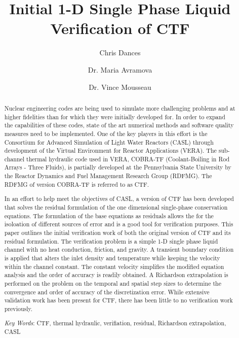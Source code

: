 \documentclass{mc2015}
\begin{document}
\title{Initial 1-D Single Phase Liquid Verification of CTF}

\author{Chris Dances}
\author{Dr. Maria Avramova}

\author{Dr. Vince Mousseau}

\maketitle

\begin{abstract}
Nuclear engineering codes are being used to simulate more challenging problems
and at higher fidelities than for which they were initially developed for. In
order to expand the capabilities of these codes, state of the art numerical methods and
software quality measures need to be implemented. One of the key players in this
effort is the Consortium for Advanced Simulation of Light Water Reactors (CASL) through
development of the Virtual Environment for Reactor Applications (VERA). The
sub-channel thermal hydraulic code used in VERA, COBRA-TF (Coolant-Boiling in
Rod Arrays - Three Fluids), is partially developed at the Pennsylvania State
University by the Reactor Dynamics and Fuel Management Research Group (RDFMG).
The RDFMG of version COBRA-TF is referred to as CTF.

In an effort to help meet the objectives of CASL, a version of CTF has been
developed that solves the residual formulation of the one dimensional 
single-phase conservation equations. The formulation of the base equations as
residuals allows the for the isoloation of different sources of error and is a
good tool for verification purposes. This paper outlines the initial
verification work of both the original version of CTF and its residual
formulation. The verification problem is a simple 1-D single phase liquid
channel with no heat conduction, friction, and gravity. A transient boundary
condition is applied that alters the inlet density and temperature while keeping
the velocity within the channel constant. The constant velocity simplifies the modified
equation analysis and the order of accuracy is readily obtained. A Richardson
extrapolation is performed on the problem on the temporal and spatial step sizes
to determine the convergence and order of accuracy of the discretization error.
While extensive validation work has been present for CTF, there has been little
to no verification work previously. 

\emph{Key Words}: CTF, thermal hydraulic, verifiation, residual, Richardson
extrapolation, CASL

\end{abstract}
\end{document}
